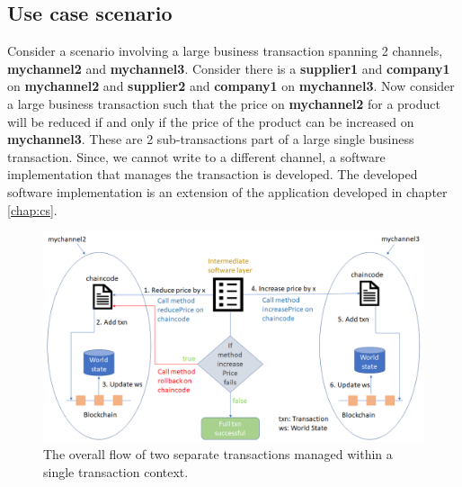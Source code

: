 \documentclass[
  a4paper,  %
  twoside,  %
  bibliography=totoc,
  headsepline,
  cleardoublepage=empty,
  parskip=half,
  draft=false
]{scrbook}
\begin{document}
\subsection{Use case scenario}
Consider a scenario involving a large business transaction spanning 2 channels, \textbf{mychannel2} and \textbf{mychannel3}. Consider there is a \textbf{supplier1} and \textbf{company1} on \textbf{mychannel2} and \textbf{supplier2} and \textbf{company1} on \textbf{mychannel3}. Now consider a large business transaction such that the price on \textbf{mychannel2} for a product will be reduced if and only if the price of the product can be increased on \textbf{mychannel3}. These are 2 sub-transactions part of a large single business transaction. Since, we cannot write to a different channel, a software implementation that manages the transaction is developed. The developed software implementation is an extension of the application developed in chapter \ref{chap:cs}.
\begin{figure}[h!]
\begin{center}
\includegraphics[width=\textwidth]{graphics/2pcDiagram.png}
\caption{The overall flow of two separate transactions managed within a single transaction context. }
\label{fig:2pcDiagram}
\end{center}
\end{figure}
\end{document}
